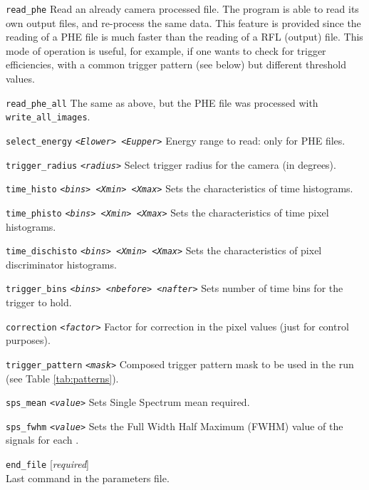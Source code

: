 \begin{Uentry}
\item[\texttt{read\_phe}]
%
  Read an already camera processed file. The program \camera is able
  to read its own output files, and re-process the same data. This
  feature is provided since the reading of a PHE file is much faster
  than the reading of a RFL ( output) file. This mode of
  operation is useful, for example, if one wants to check for trigger
  efficiencies, with a common trigger pattern (see below) but
  different threshold values.

\item[\texttt{read\_phe\_all}]
%
  The same as above, but the PHE file was processed with
  \texttt{write\_all\_images}.

\item[\texttt{select\_energy} \quad
  \texttt{<\emph{Elower}>  <\emph{Eupper}>}]
%
  Energy range to read: only for PHE files.

\item[\texttt{trigger\_radius} \quad
  \texttt{<\emph{radius}>}]
%
  Select trigger radius for the camera (in degrees).

\item[\texttt{time\_histo} \quad
  \texttt{<\emph{bins}>  <\emph{Xmin}>  <\emph{Xmax}>}]
%
  Sets the characteristics of time histograms.

\item[\texttt{time\_phisto} \quad
  \texttt{<\emph{bins}>  <\emph{Xmin}>  <\emph{Xmax}>}]
%
  Sets the characteristics of time pixel histograms.

\item[\texttt{time\_dischisto} \quad
  \texttt{<\emph{bins}>  <\emph{Xmin}>  <\emph{Xmax}>}]
%
  Sets the characteristics of pixel discriminator histograms.

\item[\texttt{trigger\_bins} \quad
  \texttt{<\emph{bins}>  <\emph{nbefore}>  <\emph{nafter}>}]
%
  Sets number of time bins for the trigger to hold.

\item[\texttt{correction} \quad
  \texttt{<\emph{factor}>}]
%
  Factor for correction in the pixel values (just for control
  purposes).

\item[\texttt{trigger\_pattern} \quad
  \texttt{<\emph{mask}>}] 
%
  Composed trigger pattern mask to be used in the run (see Table
  \ref{tab:patterns}).

\item[\texttt{sps\_mean} \quad
  \texttt{<\emph{value}>}]
%
  Sets Single \phe Spectrum mean required.

\item[\texttt{sps\_fwhm} \quad
  \texttt{<\emph{value}>}]
%
  Sets the Full Width Half Maximum (FWHM) value of the signals for
  each \phe.

\item[\texttt{end\_file}]
%
  [\emph{required}] \\
  Last command in the parameters file.

\end{Uentry}



